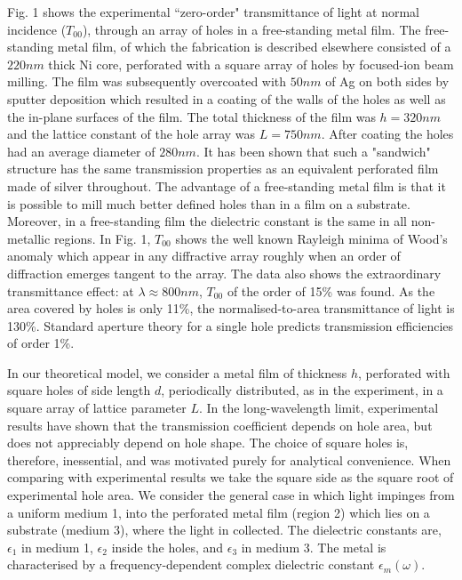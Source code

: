 Fig. 1 shows the experimental
``zero-order" transmittance of light 
at normal incidence ($T_{00}$),
through an
array of holes in a free-standing metal film.  The free-standing metal
film, of which the fabrication is described elsewhere \cite{Grupp00} consisted
of a $220nm$ thick Ni core, perforated with a square array of holes by
focused-ion beam milling.  The film was subsequently overcoated with
$50nm$ of Ag on both sides by sputter deposition which resulted in a coating of
the walls of the holes as well as the in-plane surfaces of the film.
The total thickness of the film was $h=320nm$ and the lattice constant
of the hole array was $L=750nm$.  After
coating the holes had an average diameter of $280nm$.
It has been shown \cite{Grupp00}
that such a "sandwich" structure has the same transmission properties as
an equivalent perforated film made of silver throughout.
The advantage of a free-standing metal film is that it is possible to
mill much better defined holes than in a film on a substrate.  Moreover, in a
free-standing film the dielectric constant is the same in all
non-metallic regions.
In Fig. 1, $T_{00}$ shows the well known 
Rayleigh minima of Wood's anomaly \cite{Wood}
which appear in any diffractive array roughly when an order of
diffraction emerges
tangent to the array. The data also shows the extraordinary
transmittance effect: at $\lambda \approx  800 nm$, $T_{00}$  
of the order of 15\% was found. As the area
covered by holes is only 11\%, the normalised-to-area transmittance of
light is 130\%. Standard aperture theory for a single hole predicts
transmission efficiencies of order 1\%.


In our theoretical model, we consider a metal film of thickness $h$,
perforated with square holes of side length $d$, periodically distributed,
as in the experiment, in a square array of lattice parameter $L$. 
In the long-wavelength limit, experimental results have shown that the
transmission coefficient depends on hole area, but does not appreciably 
depend on hole shape. 
The choice of square holes is, therefore, inessential, 
and was motivated purely for analytical convenience. When comparing with
experimental results we take the square side as the square root of
experimental hole area. We consider the general case in which light impinges
from a uniform medium 1, into the perforated metal film (region 2) 
which lies on a substrate (medium 3),
where the light in collected. The dielectric constants are, $\epsilon_1$ in
medium 1, $\epsilon_2$ inside the holes, and $\epsilon_3$ in medium 3. The
metal is characterised by a frequency-dependent complex dielectric constant $%
\epsilon_m(\omega)$.

